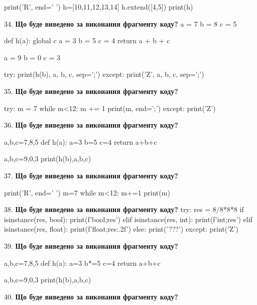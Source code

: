 \documentclass[11pt]{article}
\begin{document}
print('R', end=' ')
h=[10,11,12,13,14]
h.extend([4,5])
print(h)

\par\vspace{5mm}
34. \textbf{Що буде виведено за виконання фрагменту коду?}
a = 7
b = 8
c = 5

def h(a):
global c    a = 3
    b = 5
    c = 4
    return a + b + c

a = 9
b = 0
c = 3

try:
    print(h(b), a, b, c, sep=';')
except:
    print('Z', a, b, c, sep=';')
\par\vspace{5mm}
35. \textbf{Що буде виведено за виконання фрагменту коду?}

try:
    m = 7
    while m<12:
        m += 1
    print(m, end=';')
except:
    print('Z')

\par\vspace{5mm}
36. \textbf{Що буде виведено за виконання фрагменту коду?}

a,b,c=7,8,5
def h(a):
    a=3
    b=5
    c=4
    return a+b+c

a,b,c=9,0,3
print(h(b),a,b,c)
\par\vspace{5mm}
37. \textbf{Що буде виведено за виконання фрагменту коду?}

print('R', end=' ')
m=7
while m<12:
    m+=1
print(m)

\par\vspace{5mm}
38. \textbf{Що буде виведено за виконання фрагменту коду?}
try:
    res = 8/8*8*8
    if isinstance(res, bool):
        print(f'bool;{res}')
    elif isinstance(res, int):
        print(f'int;{res}')
    elif isinstance(res, float):
        print(f'float;{res:.2f}')
    else:
        print('???')
except:
    print('Z')
\par\vspace{5mm}
39. \textbf{Що буде виведено за виконання фрагменту коду?}

a,b,c=7,8,5
def h(a):
    a=3
    b*=5
    c=4
    return a+b+c

a,b,c=9,0,3
print(h(b),a,b,c)
\par\vspace{5mm}
40. \textbf{Що буде виведено за виконання фрагменту коду?}
\end{document}
